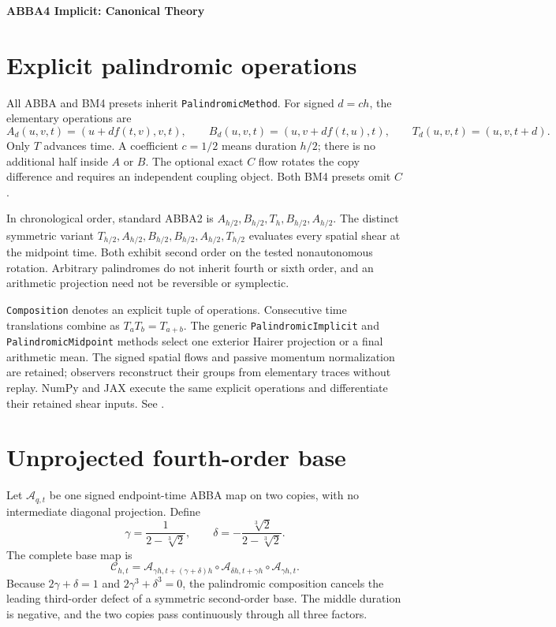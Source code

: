 \documentclass[11pt,a4paper]{article}
\begin{document}
\begin{center}
 {\LARGE\bfseries\color{gcblue}ABBA4 Implicit: Canonical Theory}\par
 \vspace{0.35em}{\large One symmetric projection around an unprojected triple jump}
\end{center}

\section*{Explicit palindromic operations}
All ABBA and BM4 presets inherit \texttt{PalindromicMethod}. For signed
$d=c h$, the elementary operations are
\[
 A_d(u,v,t)=(u+d f(t,v),v,t),\qquad
 B_d(u,v,t)=(u,v+d f(t,u),t),\qquad
 T_d(u,v,t)=(u,v,t+d).
\]
Only $T$ advances time. A coefficient $c=1/2$ means duration $h/2$;
there is no additional half inside $A$ or $B$. The optional exact $C$ flow
rotates the copy difference and requires an independent coupling object.
Both BM4 presets omit $C$.

In chronological order, standard ABBA2 is
$A_{h/2},B_{h/2},T_h,B_{h/2},A_{h/2}$.
The distinct symmetric variant
$T_{h/2},A_{h/2},B_{h/2},B_{h/2},A_{h/2},T_{h/2}$
evaluates every spatial shear at the midpoint time. Both exhibit second
order on the tested nonautonomous rotation. Arbitrary palindromes do not
inherit fourth or sixth order, and an arithmetic projection need not be
reversible or symplectic.

\texttt{Composition} denotes an explicit tuple of operations.
Consecutive time translations combine as $T_a T_b=T_{a+b}$.
The generic \texttt{PalindromicImplicit} and \texttt{PalindromicMidpoint}
methods select one exterior Hairer projection or a final arithmetic mean.
The signed spatial flows and passive momentum normalization are retained;
observers reconstruct their groups from elementary traces without replay. NumPy and JAX execute the same
explicit operations and differentiate their retained shear inputs.
See .


\section{Unprojected fourth-order base}

Let $\mathcal A_{q,t}$ be one signed endpoint-time ABBA map on two copies,
with no intermediate diagonal projection.  Define
\[
\gamma=\frac{1}{2-\sqrt[3]{2}},\qquad
\delta=-\frac{\sqrt[3]{2}}{2-\sqrt[3]{2}}.
\]
The complete base map is
\[
\mathcal C_{h,t}=
\mathcal A_{\gamma h,t+(\gamma+\delta)h}
\circ\mathcal A_{\delta h,t+\gamma h}
\circ\mathcal A_{\gamma h,t}.
\]
Because $2\gamma+\delta=1$ and $2\gamma^3+\delta^3=0$, the palindromic
composition cancels the leading third-order defect of a symmetric second-order
base.  The middle duration is negative, and the two copies pass continuously
through all three factors.
\end{document}
